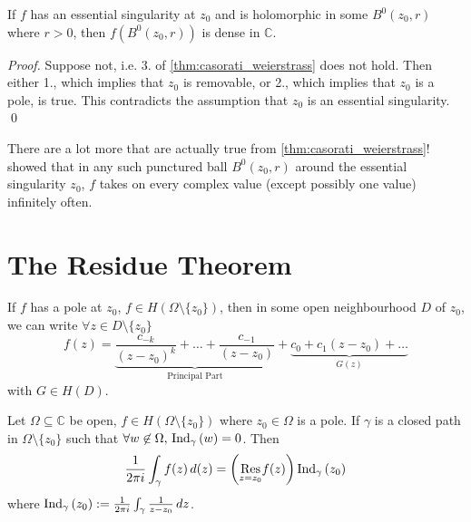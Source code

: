 \documentclass[11pt, oneside]{book}
\begin{document}
\begin{crly}\label{crly:casorati_weierstrass_crly}
If $f$ has an essential singularity at $z_0$ and is holomorphic in some $B^0(z_0, r)$ where $r > 0$, then $f(B^0(z_0, r))$ is dense in $\mathbb{C}$.
\end{crly}

\begin{proof}
  Suppose not, i.e. 3. of \cref{thm:casorati_weierstrass} does not hold. Then either 1., which implies that $z_0$ is removable, or 2., which implies that $z_0$ is a pole, is true. This contradicts the assumption that $z_0$ is an essential singularity. \qed
\end{proof}

\begin{remark}
  There are a lot more that are actually true from \cref{thm:casorati_weierstrass}!  showed that in any such punctured ball $B^0(z_0, r)$ around the essential singularity $z_0$, $f$ takes on every complex value (except possibly one value) infinitely often.
\end{remark}


\section{The Residue Theorem} %

\begin{note}[Recall]
  If $f$ has a pole at $z_0$, $f \in H(\Omega \setminus \{z_0\})$, then in some open neighbourhood $D$ of $z_0$, we can write $\forall z \in D \setminus \{z_0\}$
  \begin{equation}\label{eq:function_at_a_pole}
    f(z) = \underbrace{ \frac{c_{-k}}{(z - z_0)^k} + \hdots + \frac{c_{-1}}{(z - z_0)} }_{\text{Principal Part}} + \underbrace{ c_0 + c_1 (z - z_0) + \hdots }_{G(z)}
  \end{equation}
  with $G \in H(D)$.
\end{note}

\begin{thm}\label{thm:cauchy_s_residue_theorem}
  Let $\Omega \subseteq \mathbb{C}$ be open, $f \in H(\Omega \setminus \{z_0\})$ where $z_0 \in \Omega$ is a pole. If $\gamma$ is a closed path in $\Omega \setminus \{z_0\}$ such that $\forall w \not\in \Omega, \, \ind{w}{\gamma} = 0$. Then
  \begin{equation*}
    \frac{1}{2 \pi i} \int_{\gamma} f(z) \dif(z) = \left( \res{f(z)}{z = z_0} \right) \ind{z_0}{\gamma}
  \end{equation*}
  where $\ind{z_0}{\gamma} := \frac{1}{2 \pi i} \int_{\gamma} \frac{1}{z - z_0} \dif{z}$.
\end{thm}
\end{document}

